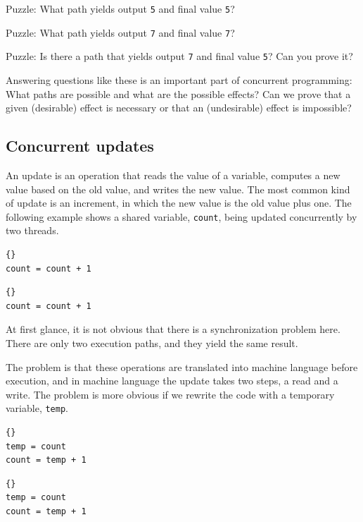 \documentclass{book}
\begin{document}
Puzzle: What path yields output {\tt 5} and final
value {\tt 5}?

Puzzle: What path yields output {\tt 7} and final
value {\tt 7}?

Puzzle: Is there a path that yields output {\tt 7} and final
value {\tt 5}?  Can you prove it?

Answering questions like these is an important part of concurrent
programming:  What paths are possible and what are the
possible effects?  Can we prove that a given (desirable) effect is
necessary or that an (undesirable) effect is impossible?


\subsection {Concurrent updates}

An update is an operation that reads the value of a variable, computes
a new value based on the old value, and writes the new value.
The most common kind of update is an increment, in which the
new value is the old value plus one.  The following example
shows a shared variable, {\tt count}, being updated concurrently
by two threads.

\begin{minipage}[t]{0.4\textwidth}
    \begin{lstlisting}[title={Thread A}]{}
count = count + 1
\end{lstlisting}
\end{minipage}
\hfill
\begin{minipage}[t]{0.4\textwidth}
    \begin{lstlisting}[title={Thread B}]{}
count = count + 1
\end{lstlisting}
\end{minipage}

At first glance, it is not obvious that there is a synchronization
problem here.  There are only two execution paths, and they
yield the same result.

The problem is that these operations are translated into
machine language before execution, and in machine language
the update takes two steps, a read and a write.
The problem is more obvious if we rewrite the code with a temporary
variable, {\tt temp}.

\begin{minipage}[t]{0.4\textwidth}
    \begin{lstlisting}[title={Thread A}]{}
temp = count
count = temp + 1
\end{lstlisting}
\end{minipage}
\hfill
\begin{minipage}[t]{0.4\textwidth}
    \begin{lstlisting}[title={Thread B}]{}
temp = count
count = temp + 1
\end{lstlisting}
\end{minipage}
\end{document}
